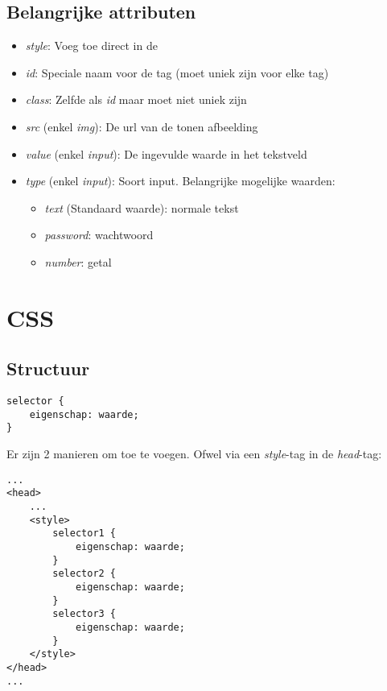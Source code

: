 \subsection{Belangrijke attributen}%
\label{sub:belangrijke_attributen}

\begin{itemize}
    \item \emph{style}: Voeg \CSS toe direct in de \HTML
    \item \emph{id}: Speciale naam voor de tag (moet uniek zijn voor elke tag)
    \item \emph{class}: Zelfde als \emph{id} maar moet niet uniek zijn
    \item \emph{src} (enkel \emph{img}): De url van de tonen afbeelding
    \item \emph{value} (enkel \emph{input}): De ingevulde waarde in het tekstveld
    \item \emph{type} (enkel \emph{input}): Soort input. Belangrijke mogelijke waarden:
        \begin{itemize}
            \item \emph{text} (Standaard waarde): normale tekst
            \item \emph{password}: wachtwoord
            \item \emph{number}: getal
        \end{itemize}
\end{itemize}

\section{CSS}%
\label{sec:css}

\subsection{Structuur}%
\label{sub:structuur}

\begin{verbatim}
selector {
    eigenschap: waarde;
}
\end{verbatim}

Er zijn 2 manieren om \CSS toe te voegen. Ofwel via een \emph{style}-tag in de \emph{head}-tag:
\begin{verbatim}
...
<head>
    ...
    <style>
        selector1 {
            eigenschap: waarde;
        }
        selector2 {
            eigenschap: waarde;
        }
        selector3 {
            eigenschap: waarde;
        }
    </style>
</head>
...
\end{verbatim}

